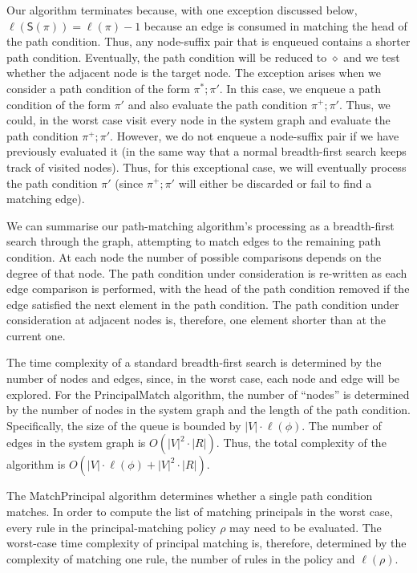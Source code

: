 \documentclass{article}
\newcommand{\tl}[1]{\mathsf{S}(#1)}
\newcommand{\comp}{\mathbin{;}}
\begin{document}
Our algorithm terminates because, with one exception discussed below, $\ell(\tl{\pi}) = \ell(\pi) - 1$ because an edge is consumed in matching the head of the path condition.
Thus, any node-suffix pair that is enqueued contains a shorter path condition.
Eventually, the path condition will be reduced to $\diamond$ and we test whether the adjacent node is the target node.
The exception arises when we consider a path condition of the form $\pi^*\comp \pi'$.
In this case, we enqueue a path condition of the form $\pi'$ and also evaluate the path condition $\pi^+ \comp \pi'$.
Thus, we could, in the worst case visit every node in the system graph and evaluate the path condition $\pi^+\comp\pi'$.
However, we do not enqueue a node-suffix pair if we have previously evaluated it (in the same way that a normal breadth-first search keeps track of visited nodes).
Thus, for this exceptional case, we will eventually process the path condition $\pi'$ (since $\pi^+\comp\pi'$ will either be discarded or fail to find a matching edge).

We can summarise our path-matching algorithm's processing as a breadth-first search through the graph, attempting to match edges to the remaining path condition.
At each node the number of possible comparisons depends on the degree of that node.
The path condition under consideration is re-written as each edge comparison is performed, with the head of the path condition removed if the edge satisfied the next element in the path condition.
The path condition under consideration at adjacent nodes is, therefore, one element shorter than at the current one.

The time complexity of a standard breadth-first search is determined by the number of nodes and edges, since, in the worst case, each node and edge will be explored.
For the \textsf{PrincipalMatch} algorithm, the number of ``nodes'' is determined by the number of nodes in the system graph and the length of the path condition.
Specifically, the size of the queue is bounded by $|V| \cdot \ell(\phi)$.
The number of edges in the system graph is $O(|V|^2 \cdot |R|)$.
Thus, the total complexity of the algorithm is $O(|V| \cdot \ell(\phi) + |V|^2 \cdot |R|)$.

The \textsf{MatchPrincipal} algorithm determines whether a single path condition matches.
In order to compute the list of matching principals in the worst case, every rule in the principal-matching policy $\rho$ may need to be evaluated.
The worst-case time complexity of principal matching is, therefore, determined by the complexity of matching one rule, the number of rules in the policy and $\ell(\rho)$.
\end{document}
